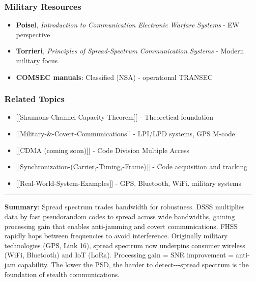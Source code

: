 \subsubsection{Military Resources}\label{military-resources}

\begin{itemize}
\tightlist
\item
  \textbf{Poisel}, \emph{Introduction to Communication Electronic
  Warfare Systems} - EW perspective
\item
  \textbf{Torrieri}, \emph{Principles of Spread-Spectrum Communication
  Systems} - Modern military focus
\item
  \textbf{COMSEC manuals}: Classified (NSA) - operational TRANSEC
\end{itemize}

\subsubsection{Related Topics}\label{related-topics}

\begin{itemize}
\tightlist
\item
  {[}{[}Shannon\textquotesingle s-Channel-Capacity-Theorem{]}{]} -
  Theoretical foundation
\item
  {[}{[}Military-\&-Covert-Communications{]}{]} - LPI/LPD systems, GPS
  M-code
\item
  {[}{[}CDMA (coming soon){]}{]} - Code Division Multiple Access
\item
  {[}{[}Synchronization-(Carrier,-Timing,-Frame){]}{]} - Code
  acquisition and tracking
\item
  {[}{[}Real-World-System-Examples{]}{]} - GPS, Bluetooth, WiFi,
  military systems
\end{itemize}

\begin{center}\rule{0.5\linewidth}{0.5pt}\end{center}

\textbf{Summary}: Spread spectrum trades bandwidth for robustness. DSSS
multiplies data by fast pseudorandom codes to spread across wide
bandwidths, gaining processing gain that enables anti-jamming and covert
communications. FHSS rapidly hops between frequencies to avoid
interference. Originally military technologies (GPS, Link 16), spread
spectrum now underpins consumer wireless (WiFi, Bluetooth) and IoT
(LoRa). Processing gain = SNR improvement = anti-jam capability. The
lower the PSD, the harder to detect-\/-\/-spread spectrum is the
foundation of stealth communications.
